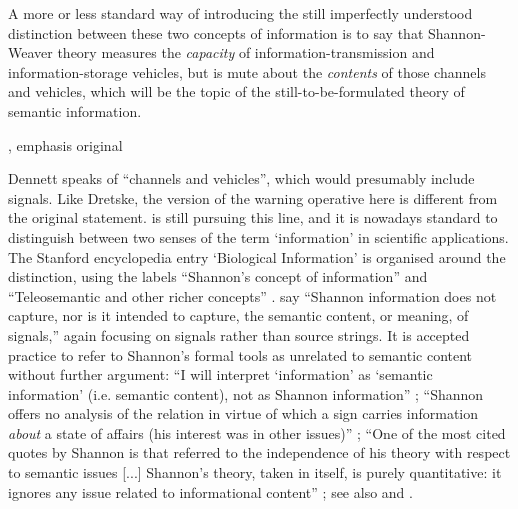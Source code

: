 \begin{myquote}
A more or less standard way of introducing the still imperfectly understood distinction between these two concepts of information is to say that Shannon-Weaver theory measures the \emph{capacity} of information-transmission and information-storage vehicles, but is mute about the \emph{contents} of those channels and vehicles, which will be the topic of the still-to-be-formulated theory of semantic information.
\par\hspace*{\fill}\citet[344]{dennett1983intentional}, emphasis original
\end{myquote}

\noindent Dennett speaks of ``channels and vehicles'', which would presumably include signals.
Like Dretske, the version of the warning operative here is different from the original statement.
\citet[$\S$6]{dennett2017bacteria} is still pursuing this line, and it is nowadays standard to distinguish between two senses of the term `information' in scientific applications.
The Stanford encyclopedia entry `Biological Information' is organised around the distinction, using the labels ``Shannon's concept of information'' and ``Teleosemantic and other richer concepts'' \citep{godfrey-smith2016biological}.
\citet[21]{piccinini2011information} say ``Shannon information does not capture, nor is it intended to capture, the semantic content, or meaning, of signals,'' again focusing on signals rather than source strings.
It is accepted practice to refer to Shannon's formal tools as unrelated to semantic content without further argument: ``I will interpret ‘information’ as ‘semantic information’ (i.e. semantic content), not as Shannon information'' \citep[p. 12 n. 14]{artiga2020signals}; ``Shannon offers no analysis of the relation in virtue of which a sign carries information \textit{about} a state of affairs (his interest was in other issues)''  \citep[p. 7, emphasis original]{neander2017mark}; ``One of the most cited quotes by Shannon is that referred to the independence of his theory with respect to semantic issues [...] Shannon’s theory, taken in itself, is purely quantitative: it ignores any issue related to informational content'' \citep[1988-9]{lombardi2015shannon}; see also \citet[6]{cao2020new} and \citet[1]{kolchinsky2018semantic}.

